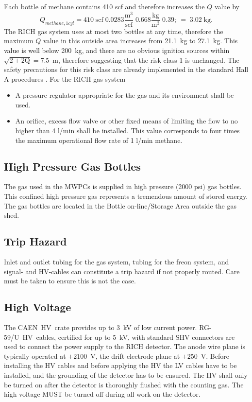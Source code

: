 \begin{safetyen}{0}{0}
Each bottle of methane contains 410 scf and therefore increases the $Q$ value by
\begin{equation}
Q_{methane,1cyl} = 410 \; \mbox{scf} \; 0.0283 \frac{\mbox{m}^3}{\mbox{scf}} \; 0.668 \frac{\mbox{kg}}{\mbox{m}^3} \; 0.39 ;\ = \; 3.02 \; \mbox{kg}.
\end{equation}
The RICH gas system uses at most two bottles at any time, therefore the maximum $Q$ value in
this outside area increases  from 21.1~kg to 27.1~kg. This value is well below 200~kg, and 
there are no obvious ignition sources within $\sqrt{2 + 2 \mbox{Q}} = 7.5$~m, therefore
suggesting that the risk class 1 is unchanged. The safety precautions for this risk class
are already implemented in the standard Hall A procedures \cite{Hawgswww}. For the RICH gas system
\begin{itemize}

\item A pressure regulator appropriate for the gas and its environment shall be used. 
 
\item An orifice, excess flow valve or other fixed means of limiting the flow to no higher
than 4 l/min shall be installed. This value corresponds to four times the maximum
operational flow rate of 1 l/min methane.

\end{itemize}

\subsection{High Pressure Gas Bottles} The gas used in the MWPCs is supplied in high pressure (2000 psi) 
gas bottles. This confined high pressure gas represents a tremendous amount of stored energy. 
The gas bottles are located  in the Bottle on-line/Storage Area outside the gas shed.

\subsection{Trip Hazard} Inlet and outlet tubing for the gas system, tubing for the freon system,
and signal- and HV-cables can constitute a trip hazard if not 
properly routed. Care must be taken to ensure this is not the case. 

\subsection{High Voltage} The CAEN~HV~crate
provides up to 3~kV of low current power.
RG-59/U~HV~cables, certified for up to 5~kV, with standard SHV 
connectors are used to connect the power supply to the RICH detector.
The anode wire plane is typically operated at $+2100$~V, the 
drift electrode plane at $+250$~V.
Before installing the HV cables and before applying the HV the 
LV cables have to be installed, and the grounding of the detector 
has to be ensured. The HV shall only be turned on after the 
detector is thoroughly flushed with the counting gas.
The high voltage MUST be turned off during all work on the detector.

\end{safetyen}

